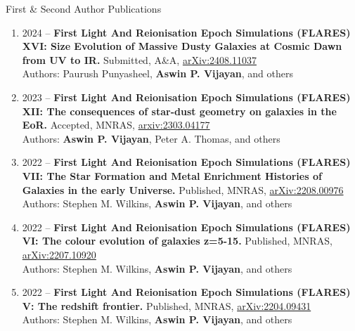 \documentclass[a4paper,10pt]{resume} %
\begin{document}
\begin{rSection}{First \& Second Author Publications}
\begin{enumerate}
   \item {2024 -- \bf First Light And Reionisation Epoch Simulations (FLARES) XVI: Size Evolution of Massive Dusty Galaxies at Cosmic Dawn from UV to IR.} Submitted, A\&A, \href{https://arxiv.org/abs/2408.11037}{\color{blue}arXiv:2408.11037}\\
    Authors: Paurush Punyasheel, \textbf{Aswin P. Vijayan}, and others
    \item {2023 -- \bf First Light And Reionisation Epoch Simulations (FLARES) XII: The consequences of star-dust geometry on galaxies in the EoR.} Accepted, MNRAS, \href{https://arxiv.org/abs/2303.04177}{\color{blue}arxiv:2303.04177}\\
    Authors: \textbf{Aswin P. Vijayan}, Peter A. Thomas, and others
    \item {2022 -- \bf First Light And Reionisation Epoch Simulations (FLARES) VII: The Star Formation and Metal
    Enrichment Histories of Galaxies in the early Universe.} Published, MNRAS, \href{https://arxiv.org/abs/2208.00976}{\color{blue} arXiv:2208.00976}\\
    Authors: Stephen M. Wilkins, \textbf{Aswin P. Vijayan}, and others
    \item {2022 -- \bf First Light And Reionisation Epoch Simulations (FLARES) VI: The colour evolution of galaxies z=5-15.} Published, MNRAS, \href{https://arxiv.org/abs/2207.10920}{\color{blue} arXiv:2207.10920}\\
    Authors: Stephen M. Wilkins, \textbf{Aswin P. Vijayan}, and others
    \item {2022 -- \bf First Light And Reionisation Epoch Simulations	(FLARES) V: The redshift frontier.} Published, MNRAS, \href{https://arxiv.org/abs/2204.09431}{\color{blue} arXiv:2204.09431}\\
    Authors: Stephen M. Wilkins, \textbf{Aswin P. Vijayan}, and others

\end{enumerate}
\end{rSection}
\end{document}
